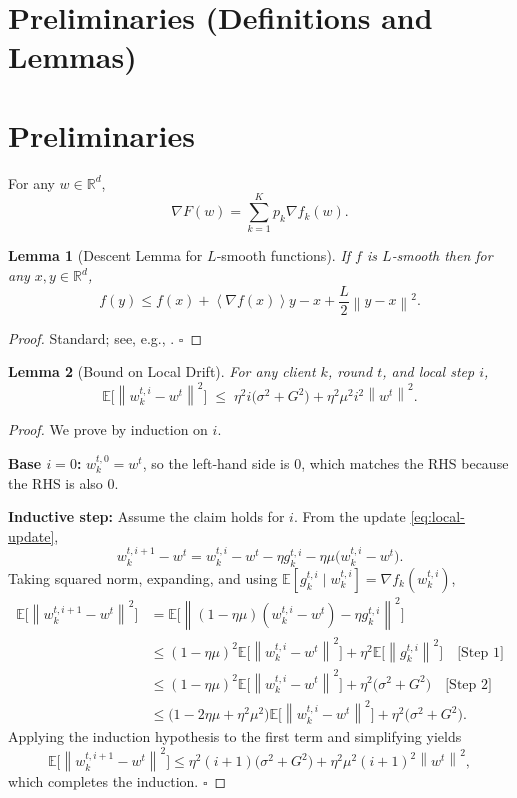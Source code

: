\documentclass{article}
\newcommand{\E}{\mathbb{E}}
\newcommand{\norm}[1]{\left\lVert#1\right\rVert}
\newcommand{\inner}[1]{\left\langle#1\right\rangle}
\newcommand{\R}{\mathbb{R}}
\newtheorem{lemma}{Lemma}
\begin{document}
\section*{Preliminaries (Definitions and Lemmas)}
\section{Preliminaries}
\begin{definition}
For any $w\in\R^{d}$,
\[
\nabla F(w)=\sum_{k=1}^{K}p_k\nabla f_k(w).
\]
\end{definition}

\begin{lemma}[Descent Lemma for $L$‑smooth functions]\label{lem:descent}
If $f$ is $L$‑smooth then for any $x,y\in\R^{d}$,
\[
f(y)\le f(x)+\inner{\nabla f(x)}{y-x}+\frac{L}{2}\norm{y-x}^{2}.
\]
\end{lemma}
\begin{proof}
Standard; see, e.g., \cite{nesterov2004introductory}. \hfill $\square$
\end{proof}

\begin{lemma}[Bound on Local Drift]\label{lem:drift}
For any client $k$, round $t$, and local step $i$,
\[
\E\bigl[\norm{w_{k}^{t,i}-w^{t}}^{2}\bigr]
\;\le\;
\eta^{2}i\bigl(\sigma^{2}+G^{2}\bigr)
    + \eta^{2}\mu^{2}i^{2}\norm{w^{t}}^{2}.
\]
\end{lemma}
\begin{proof}
We prove by induction on $i$.

\textbf{Base $i=0$:} $w_{k}^{t,0}=w^{t}$, so the left‑hand side is $0$,
which matches the RHS because the RHS is also $0$.

\textbf{Inductive step:} Assume the claim holds for $i$.
From the update \eqref{eq:local-update},
\[
w_{k}^{t,i+1}-w^{t}
= w_{k}^{t,i}-w^{t}
   -\eta g_{k}^{t,i}
   -\eta\mu\bigl(w_{k}^{t,i}-w^{t}\bigr).
\]
Taking squared norm, expanding, and using $\E[g_{k}^{t,i}\mid w_{k}^{t,i}]=\nabla f_k(w_{k}^{t,i})$,
\[
\begin{aligned}
\E\!\bigl[\norm{w_{k}^{t,i+1}-w^{t}}^{2}\bigr]
&= \E\!\bigl[\norm{(1-\eta\mu)(w_{k}^{t,i}-w^{t})-\eta g_{k}^{t,i}}^{2}\bigr]\\
&\le (1-\eta\mu)^{2}\E\!\bigl[\norm{w_{k}^{t,i}-w^{t}}^{2}\bigr]
   +\eta^{2}\E\!\bigl[\norm{g_{k}^{t,i}}^{2}\bigr] \quad\text{[Step 1]}\\
&\le (1-\eta\mu)^{2}\E\!\bigl[\norm{w_{k}^{t,i}-w^{t}}^{2}\bigr]
   +\eta^{2}\bigl(\sigma^{2}+G^{2}\bigr) \quad\text{[Step 2]}\\
&\le \bigl(1-2\eta\mu+\eta^{2}\mu^{2}\bigr)\E\!\bigl[\norm{w_{k}^{t,i}-w^{t}}^{2}\bigr]
   +\eta^{2}\bigl(\sigma^{2}+G^{2}\bigr) .
\end{aligned}
\]
Applying the induction hypothesis to the first term and simplifying yields
\[
\E\!\bigl[\norm{w_{k}^{t,i+1}-w^{t}}^{2}\bigr]
\le
\eta^{2}(i+1)\bigl(\sigma^{2}+G^{2}\bigr)
   +\eta^{2}\mu^{2}(i+1)^{2}\norm{w^{t}}^{2},
\]
which completes the induction.  \hfill $\square$
\end{proof}
\end{document}
